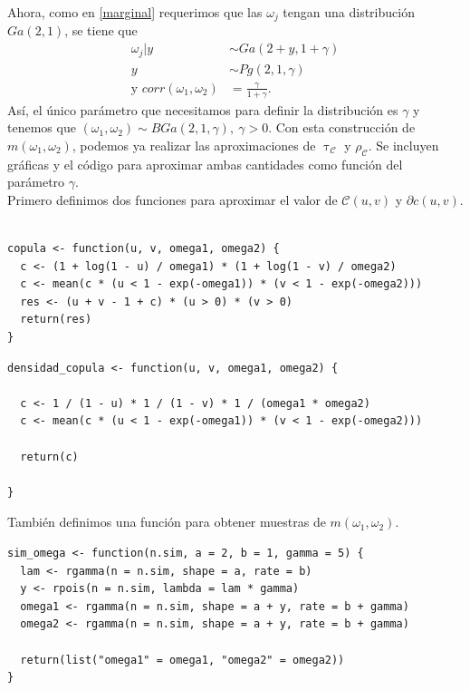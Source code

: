 \documentclass[11pt,a4paper]{article}
\newcommand{\C}{\mathcal{C}}
\begin{document}
Ahora, como en \eqref{marginal} requerimos que las $\omega_j$ tengan una distribución $Ga(2, 1)$, se tiene que 
\begin{align} \label{eq_omegas}
\omega_j | y &\sim Ga(2 + y, 1 + \gamma) \nonumber\\
y &\sim Pg(2, 1, \gamma)\\
\text{y } corr(\omega_1, \omega_2) &= \frac{\gamma}{1 + \gamma}. \nonumber
\end{align}
Así, el único parámetro que necesitamos para definir la distribución es $\gamma$ y tenemos que $(\omega_1, \omega_2) \sim BGa(2, 1, \gamma), \ \gamma >0$. Con esta construcción de $m(\omega_1, \omega_2)$, podemos ya realizar las aproximaciones de $\uptau_\C$ y $\rho_\C$. Se incluyen gráficas y el código para aproximar ambas cantidades como función del parámetro $\gamma$.\\

Primero definimos dos funciones para aproximar el valor de $\C(u, v)$ y $\partial c(u, v)$.

\begin{lstlisting}

copula <- function(u, v, omega1, omega2) {
  c <- (1 + log(1 - u) / omega1) * (1 + log(1 - v) / omega2)
  c <- mean(c * (u < 1 - exp(-omega1)) * (v < 1 - exp(-omega2)))
  res <- (u + v - 1 + c) * (u > 0) * (v > 0)
  return(res)
}

\end{lstlisting}

\begin{lstlisting}
densidad_copula <- function(u, v, omega1, omega2) {
  
  c <- 1 / (1 - u) * 1 / (1 - v) * 1 / (omega1 * omega2)
  c <- mean(c * (u < 1 - exp(-omega1)) * (v < 1 - exp(-omega2)))
  
  return(c)
  
}
\end{lstlisting}

También definimos una función para obtener muestras de $m(\omega_1, \omega_2)$.

\begin{lstlisting}
sim_omega <- function(n.sim, a = 2, b = 1, gamma = 5) {
  lam <- rgamma(n = n.sim, shape = a, rate = b)
  y <- rpois(n = n.sim, lambda = lam * gamma)
  omega1 <- rgamma(n = n.sim, shape = a + y, rate = b + gamma)
  omega2 <- rgamma(n = n.sim, shape = a + y, rate = b + gamma)
  
  return(list("omega1" = omega1, "omega2" = omega2))
}

\end{lstlisting}
\end{document}
